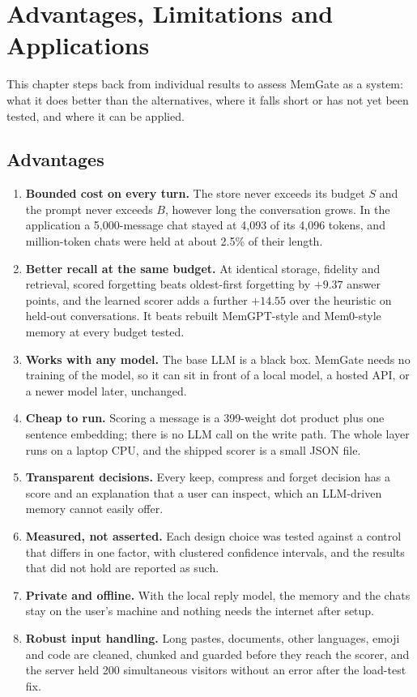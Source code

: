 \chapter{Advantages, Limitations and Applications}
\label{ch:adv}

This chapter steps back from individual results to assess MemGate as a
system: what it does better than the alternatives, where it falls short or
has not yet been tested, and where it can be applied.

\section{Advantages}
\begin{enumerate}
\item \textbf{Bounded cost on every turn.} The store never exceeds its budget
  $S$ and the prompt never exceeds $B$, however long the conversation grows.
  In the application a 5{,}000-message chat stayed at 4{,}093 of its 4{,}096
  tokens, and million-token chats were held at about 2.5\% of their length.
\item \textbf{Better recall at the same budget.} At identical storage,
  fidelity and retrieval, scored forgetting beats oldest-first forgetting by
  $+9.37$ answer points, and the learned scorer adds a further $+14.55$ over
  the heuristic on held-out conversations. It beats rebuilt MemGPT-style and
  Mem0-style memory at every budget tested.
\item \textbf{Works with any model.} The base LLM is a black box. MemGate
  needs no training of the model, so it can sit in front of a local model, a
  hosted API, or a newer model later, unchanged.
\item \textbf{Cheap to run.} Scoring a message is a 399-weight dot product
  plus one sentence embedding; there is no LLM call on the write path. The
  whole layer runs on a laptop CPU, and the shipped scorer is a small JSON
  file.
\item \textbf{Transparent decisions.} Every keep, compress and forget
  decision has a score and an explanation that a user can inspect, which an
  LLM-driven memory cannot easily offer.
\item \textbf{Measured, not asserted.} Each design choice was tested against
  a control that differs in one factor, with clustered confidence intervals,
  and the results that did not hold are reported as such.
\item \textbf{Private and offline.} With the local reply model, the memory
  and the chats stay on the user's machine and nothing needs the internet
  after setup.
\item \textbf{Robust input handling.} Long pastes, documents, other
  languages, emoji and code are cleaned, chunked and guarded before they
  reach the scorer, and the server held 200 simultaneous visitors without an
  error after the load-test fix.
\end{enumerate}

